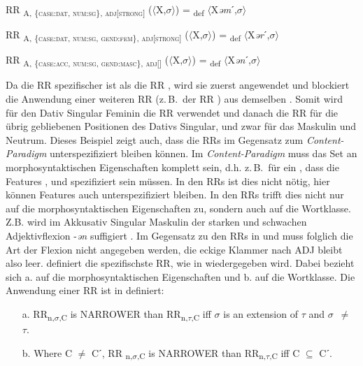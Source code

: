 \ea%
    \label{ex:key:21}
 RR \textsubscript{A, \{\textsc{case:dat}, \textsc{num:sg}\}, \textsc{adj[strong]}} ($\langle$X,$\sigma$$\rangle$) = \textsubscript{def} $\langle$X\textit{əm}ˊ,$\sigma$$\rangle$
\z
 
\ea%
    \label{ex:key:22}
RR \textsubscript{A, \{\textsc{case:dat}, \textsc{num:sg}, \textsc{gend:fem}\}, \textsc{adj[strong]}} ($\langle$X,$\sigma$$\rangle$) = \textsubscript{def} $\langle$X\textit{ər}ˊ,$\sigma$$\rangle$
\z

\ea%
    \label{ex:key:23}
RR \textsubscript{A, \{\textsc{case:acc}, \textsc{num:sg}, \textsc{gend:masc}\}, \textsc{adj[]}} ($\langle$X,$\sigma$$\rangle$) = \textsubscript{def} $\langle$X\textit{ən}ˊ,$\sigma$$\rangle$
\z

Da die RR  spezifischer ist als die RR , wird sie zuerst angewendet und blockiert die Anwendung einer weiteren RR (z.\,B.\ der RR ) aus demselben . Somit wird für den Dativ Singular Feminin die RR  verwendet und danach die RR  für die übrig gebliebenen Positionen des Dativs Singular, und zwar für das Maskulin und Neutrum. Dieses Beispiel zeigt auch, dass die RRs im Gegensatz zum \textit{Content-Paradigm} unterspezifiziert bleiben können. Im \textit{Content-Paradigm} muss das Set an morphosyntaktischen Eigenschaften komplett sein, d.h. z.\,B.\ für ein , dass die Features ,  und  spezifiziert sein müssen. In den RRs ist dies nicht nötig, hier können Features auch unterspezifiziert bleiben. In den RRs trifft dies nicht nur auf die morphosyntaktischen Eigenschaften zu, sondern auch auf die Wortklasse. Z.B. wird im Akkusativ Singular Maskulin der starken und schwachen Adjektivflexion -\textit{ən} suffigiert . Im Gegensatz zu den RRs in  und  muss folglich die Art der Flexion nicht angegeben werden, die eckige Klammer nach ADJ bleibt also leer. \citet{Stump2001} definiert die spezifischste RR, wie in  wiedergegeben wird. Dabei bezieht sich a. auf die morphosyntaktischen Eigenschaften und b. auf die Wortklasse. Die Anwendung einer RR ist in  definiert:

\ea%
    \label{ex:key:24}
\begin{itemize}
\item[a.] RR\textsubscript{n,}\textsubscript{$\sigma $}\textsubscript{,C} is NARROWER than RR\textsubscript{n,}\textsubscript{$\tau $}\textsubscript{,C} iff $\sigma $ is an extension of $\tau $ and \mbox{$\sigma $ ${\neq}$ $\tau $}.
\item[b.] Where C ${\neq}$ Cˊ, RR \textsubscript{n,}\textsubscript{$\sigma $}\textsubscript{,C} is NARROWER than RR\textsubscript{n,}\textsubscript{$\tau $}\textsubscript{,C} iff C ${\subseteq}$ Cˊ. \citep[52]{Stump2001}
\end{itemize}
\z


